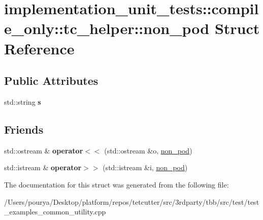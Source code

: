 \hypertarget{structimplementation__unit__tests_1_1compile__only_1_1tc__helper_1_1non__pod}{}\section{implementation\+\_\+unit\+\_\+tests\+:\+:compile\+\_\+only\+:\+:tc\+\_\+helper\+:\+:non\+\_\+pod Struct Reference}
\label{structimplementation__unit__tests_1_1compile__only_1_1tc__helper_1_1non__pod}
\subsection*{Public Attributes}
\begin{DoxyCompactItemize}
\item 
\hypertarget{structimplementation__unit__tests_1_1compile__only_1_1tc__helper_1_1non__pod_a75868f990ebcfcfe339d406fefa3dfc6}{}std\+::string {\bfseries s}\label{structimplementation__unit__tests_1_1compile__only_1_1tc__helper_1_1non__pod_a75868f990ebcfcfe339d406fefa3dfc6}

\end{DoxyCompactItemize}
\subsection*{Friends}
\begin{DoxyCompactItemize}
\item 
\hypertarget{structimplementation__unit__tests_1_1compile__only_1_1tc__helper_1_1non__pod_afb89c24d39c31b41855be4f6148092d8}{}std\+::ostream \& {\bfseries operator$<$$<$} (std\+::ostream \&o, \hyperlink{structimplementation__unit__tests_1_1compile__only_1_1tc__helper_1_1non__pod}{non\+\_\+pod})\label{structimplementation__unit__tests_1_1compile__only_1_1tc__helper_1_1non__pod_afb89c24d39c31b41855be4f6148092d8}

\item 
\hypertarget{structimplementation__unit__tests_1_1compile__only_1_1tc__helper_1_1non__pod_af32195ee156d07bdb3d742d785a4a680}{}std\+::istream \& {\bfseries operator$>$$>$} (std\+::istream \&i, \hyperlink{structimplementation__unit__tests_1_1compile__only_1_1tc__helper_1_1non__pod}{non\+\_\+pod})\label{structimplementation__unit__tests_1_1compile__only_1_1tc__helper_1_1non__pod_af32195ee156d07bdb3d742d785a4a680}

\end{DoxyCompactItemize}


The documentation for this struct was generated from the following file\+:\begin{DoxyCompactItemize}
\item 
/\+Users/pourya/\+Desktop/platform/repos/tetcutter/src/3rdparty/tbb/src/test/test\+\_\+examples\+\_\+common\+\_\+utility.\+cpp\end{DoxyCompactItemize}
